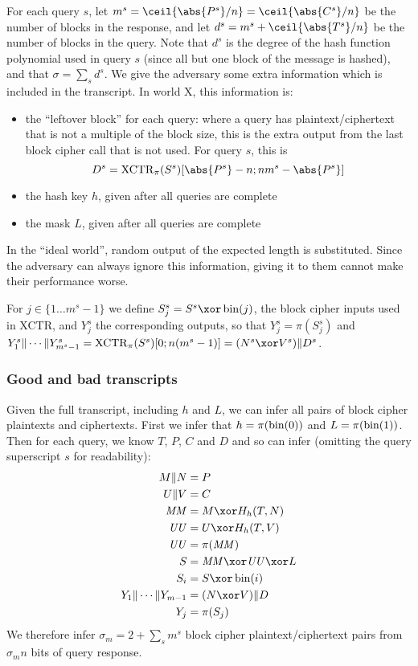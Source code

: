 \documentclass[hctr.tex]{subfiles}
\begin{document}
For each query \(s\), 
let \(m^s = \ceil{\abs{P^s}/n} = \ceil{\abs{C^s}/n}\)
be the number of blocks in the response,
and let \(d^s = m^s + \ceil{\abs{T^s}/n}\)
be the number of blocks in the query.
Note that \(d^s\) is the degree of the hash
function polynomial used in query \(s\)
(since all but one block of the message is hashed),
and that \(\sigma = \sum_s d^s\).
We give the adversary some extra information
which is included in the transcript.
In world X, this information is:
\begin{itemize}
    \item the ``leftover block'' for each query:
    where a query has plaintext/ciphertext
    that is not a multiple of the block size,
    this is the extra output from the last
    block cipher call that is not used.
    For query \(s\), this is 
    \begin{displaymath}
        D^s = \XCTR_\pi(S^s)[\abs{P^s} - n; nm^s-\abs{P^s}]
    \end{displaymath}
    \item the hash key \(h\), given after all queries are complete
    \item the mask \(L\), given after all queries are complete
\end{itemize}
In the ``ideal world'', random output of the expected
length is substituted. Since the adversary can always ignore
this information, giving it to them cannot make their performance worse.

For \(j \in \{1 \ldots m^s-1\}\) we define \(S_j^s = S^s \xor \fromint(j)\),
the block cipher inputs used in XCTR, and \(Y_j^s\) the corresponding
outputs, so that \(Y_j^s = \pi(S_j^s)\) and 
\(Y_1^s \Concat \cdots \Concat Y_{m^s-1}^s = \XCTR_\pi(S^s)[0;n(m^s -1)] 
= (N^s \xor V^s) \Concat D^s\).

\subsubsection{Good and bad transcripts}
Given the full transcript, including \(h\) and \(L\),
we can infer all pairs of block cipher plaintexts and ciphertexts.
First we infer that \(h = \pi(\operatorname{bin}(0))\) and \(L = \pi(\operatorname{bin}(1))\).
Then for each query, we know \(T\), \(P\), \(C\) and \(D\)
and so can infer
(omitting the query superscript \(s\) for readability):
\begin{align*}
    M \Concat N &= P \\
    U \Concat V &= C \\
    \MM &= M \xor H_h(T, N)\\
    \UU &= U \xor H_h(T, V)\\
    \UU &= \pi(\MM)\\
    S &= \MM \xor \UU \xor L\\ 
    S_i &= S \xor \fromint(i)\\
    Y_1 \Concat \cdots \Concat Y_{m-1} &= (N \xor V) \Concat D \\
    Y_j &= \pi(S_j) \\
\end{align*}
We therefore infer \(\sigma_m = 2 + \sum_s m^s \) block cipher
plaintext/ciphertext pairs from \(\sigma_m n\) bits of query response.
\end{document}
